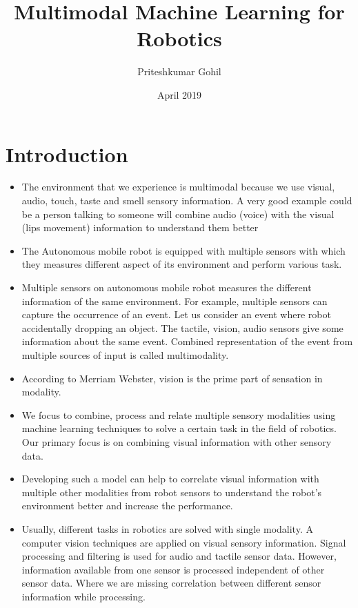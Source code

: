 \documentclass[rnd]{mas_proposal}
\title{Multimodal Machine Learning for Robotics}
\author{Priteshkumar Gohil}
\date{April 2019}
\begin{document}
\maketitle

\pagestyle{plain}

\chapter{Introduction}
\begin{itemize}
    \item The environment that we experience is multimodal because we use visual, audio, touch, taste and smell sensory information. A very good example could be a person talking to someone will combine audio (voice) with the visual (lips movement) information to understand them better
    \item The Autonomous mobile robot is equipped with multiple sensors with which they measures different aspect of its environment and perform various task. 
    \item Multiple sensors on autonomous mobile robot measures the different information of the same environment. For example, multiple sensors can capture the occurrence of an event. Let us consider an event where robot accidentally dropping an object. The tactile, vision, audio sensors give some information about the same event. Combined representation of the event from multiple sources of input is called multimodality.
    \item According to Merriam Webster, vision is the prime part of sensation in modality.
    \item We focus to combine, process and relate multiple sensory modalities using machine learning techniques to solve a certain task in the field of robotics. Our primary focus is on combining visual information with other sensory data.
    \item Developing such a model can help to correlate visual information with multiple other modalities from robot sensors to understand the robot's environment better and increase the performance.
    \item Usually, different tasks in robotics are solved with single modality. A computer vision techniques are applied on visual sensory information. Signal processing and filtering is used for audio and tactile sensor data. However, information available from one sensor is processed independent of other sensor data. Where we are missing correlation between different sensor information while processing.

\end{itemize}
\end{document}
